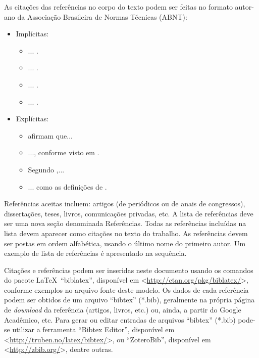 \documentclass[%
  article,%
  10pt,%
  a4paper,%
  fleqn,%
  oneside,%
  sumario = tradicional,%
  chapter = TITLE,%
  section = TITLE,%
]{abntex2}
\begin{document}
As citações das referências no corpo do texto podem ser feitas no formato autor-ano da Associação Brasileira de Normas Técnicas (ABNT):

\begin{itemize}
\item Implícitas:
\begin{itemize}
\item ... \cite{VanEkenstein1997}.
\item ... \cite{Coleman1991,Nriagu1988}.
\item ... \cite{Wizentier1992,Faina2000,Larsson2018}.
\item ... \cite{VanEkenstein1997,Nriagu1988,Faina2000}.
\end{itemize}
\item Explícitas:
\begin{itemize}
\item \textcite{VanEkenstein1997} afirmam que...
\item ..., conforme visto em \textcite{Coleman1991,Nriagu1988}.
\item Segundo \textcite{Wizentier1992,Faina2000,Larsson2018},...
\item ... como as definições de \textcite{VanEkenstein1997,Nriagu1988,Faina2000}.
\end{itemize}
\end{itemize}

Referências aceitas incluem: artigos (de periódicos ou de anais de congressos), dissertações, teses, livros, comunicações privadas, etc. A lista de referências deve ser uma nova seção denominada Referências. Todas as referências incluídas na lista devem aparecer como citações no texto do trabalho. As referências devem ser postas em ordem alfabética, usando o último nome do primeiro autor. Um exemplo de lista de referências é apresentado na sequência.

Citações e referências podem ser inseridas neste documento usando os comandos do pacote \LaTeX\ ``biblatex'', disponível em <\url{http://ctan.org/pkg/biblatex/}>, conforme exemplos no arquivo fonte deste modelo. Os dados de cada referência podem ser obtidos de um arquivo ``bibtex'' (*.bib), geralmente na própria página de \textit{download} da referência (artigos, livros, etc.) ou, ainda, a partir do Google Acadêmico, etc. Para gerar ou editar entradas de arquivos ``bibtex'' (*.bib) pode-se utilizar a ferramenta ``Bibtex Editor'', disponível em <\url{http://truben.no/latex/bibtex/}>, ou ``ZoteroBib'', disponível em <\url{http://zbib.org/}>, dentre outras.
\end{document}
